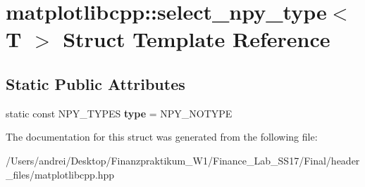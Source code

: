 \hypertarget{structmatplotlibcpp_1_1select__npy__type}{}\section{matplotlibcpp\+:\+:select\+\_\+npy\+\_\+type$<$ T $>$ Struct Template Reference}
\label{structmatplotlibcpp_1_1select__npy__type}
\subsection*{Static Public Attributes}
\begin{DoxyCompactItemize}
\item 
\mbox{\label{structmatplotlibcpp_1_1select__npy__type_acbffa4e6e1d047b52e12330446816c9c}} 
static const N\+P\+Y\+\_\+\+T\+Y\+P\+ES {\bfseries type} = N\+P\+Y\+\_\+\+N\+O\+T\+Y\+PE
\end{DoxyCompactItemize}


The documentation for this struct was generated from the following file\+:\begin{DoxyCompactItemize}
\item 
/\+Users/andrei/\+Desktop/\+Finanzpraktikum\+\_\+\+W1/\+Finance\+\_\+\+Lab\+\_\+\+S\+S17/\+Final/header\+\_\+files/matplotlibcpp.\+hpp\end{DoxyCompactItemize}
